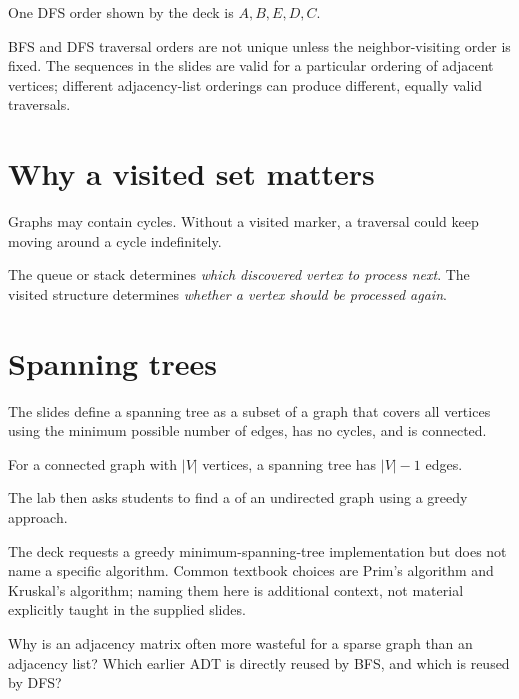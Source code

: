 One DFS order shown by the deck is $A,B,E,D,C$.

\begin{clarification}
BFS and DFS traversal orders are not unique unless the neighbor-visiting order is fixed. The sequences in the slides are valid for a particular ordering of adjacent vertices; different adjacency-list orderings can produce different, equally valid traversals.
\end{clarification}

\section{Why a visited set matters}

Graphs may contain cycles. Without a visited marker, a traversal could keep moving around a cycle indefinitely.

\begin{keyidea}
The queue or stack determines \emph{which discovered vertex to process next}. The visited structure determines \emph{whether a vertex should be processed again}.
\end{keyidea}

\section{Spanning trees}

The slides define a spanning tree as a subset of a graph that covers all vertices using the minimum possible number of edges, has no cycles, and is connected.

For a connected graph with $|V|$ vertices, a spanning tree has $|V|-1$ edges.

The lab then asks students to find a  of an undirected graph using a greedy approach.

\begin{clarification}
The deck requests a greedy minimum-spanning-tree implementation but does not name a specific algorithm. Common textbook choices are Prim's algorithm and Kruskal's algorithm; naming them here is additional context, not material explicitly taught in the supplied slides.
\end{clarification}

\begin{quickcheck}
Why is an adjacency matrix often more wasteful for a sparse graph than an adjacency list? Which earlier ADT is directly reused by BFS, and which is reused by DFS?
\end{quickcheck}

